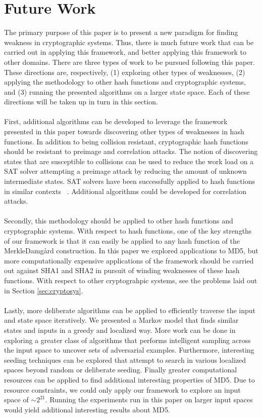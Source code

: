 \documentclass[letterpaper,twocolumn,10pt]{article}
\begin{document}
\section{Future Work}

The primary purpose of this paper is to present a new paradigm for finding weakness in cryptographic systems. Thus, there is much future work that can be carried out in applying this framework, and better applying this framework to other domains. There are three types of work to be pursued following this paper. These directions are, respectively, (1) exploring other types of weaknesses, (2) applying the methodology to other hash functions and cryptographic systems, and (3) running the presented algorithms on a larger state space. Each of these directions will be taken up in turn in this section. 
\\
\\
First, additional algorithms can be developed to leverage the framework presented in this paper towards discovering other types of weaknesses in hash functions. In addition to being collision resistant, cryptographic hash functions should be resistant to preimage and correlation attacks. The notion of discovering states that are susceptible to collisions can be used to reduce the work load on a SAT solver attempting a preimage attack by reducing the amount of unknown intermediate states. SAT solvers have been successfully applied to hash functions in similar contexts ~\cite{mironov2006applications}. Additional algorithms could be developed for correlation attacks. 
\\
\\
Secondly, this methodology should be applied to other hash functions and cryptographic systems. With respect to hash functions, one of the key strengths of our framework is that it can easily be applied to any hash function of the Merkle{\textendash}Damg\r{a}rd construction. In this paper we explored applications to MD5, but more computationally expensive applications of the framework should be carried out against SHA1 and SHA2 in pursuit of winding weaknesses of these hash functions. With respect to other cryptograhpic systems, see the problems laid out in Section \ref{sec:cryptosys}.
\\
\\
Lastly, more deliberate algorithms can be applied to efficiently traverse the input and state space iteratively. We presented a Markov model that finds similar states and inputs in a greedy and localized way. More work can be done in exploring a greater class of algorithms that performs intelligent sampling across the input space to uncover sets of adversarial examples. Furthermore, interesting seeding techniques can be explored that attempt to search in various localized spaces beyond random or deliberate seeding. Finally greater computational resources can be applied to find additional interesting properties of MD5. Due to resource constraints, we could only apply our framework to explore an input space of  $\sim 2^{21}$. Running the experiments run in this paper on larger input spaces would yield additional interesting results about MD5. 
\end{document}
